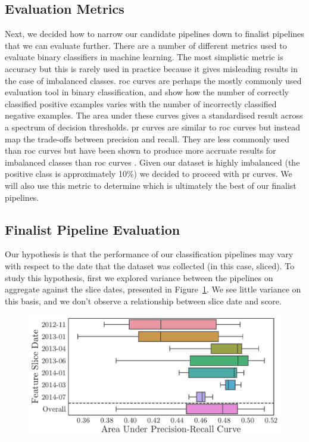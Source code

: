 \documentclass[../thesis/thesis.tex]{subfiles}
\begin{document}
\subsection{Evaluation Metrics}

Next, we decided how to narrow our candidate pipelines down to finalist pipelines that we can evaluate further. There are a number of different metrics used to evaluate binary classifiers in machine learning. The most simplistic metric is accuracy but this is rarely used in practice because it gives misleading results in the case of imbalanced classes. \Gls{roc} curves are perhaps the mostly commonly used evaluation tool in binary classification, and show how the number of correctly classified positive examples varies with the number of incorrectly classified negative examples. The area under these curves gives a standardised result across a spectrum of decision thresholds. \Gls{pr} curves are similar to \gls{roc} curves but instead map the trade-offs between precision and recall. They are less commonly used than \gls{roc} curves but have been shown to produce more accruate results for imbalanced classes than \gls{roc} curves \cite{davis2006}. Given our dataset is highly imbalanced (the positive class is approximately 10\%) we decided to proceed with \gls{pr} curves. We will also use this metric to determine which is ultimately the best of our finalist pipelines.

\subsection{Finalist Pipeline Evaluation}

Our hypothesis is that the performance of our classification pipelines may vary with respect to the date that the dataset was collected (in this case, sliced). To study this hypothesis, first we explored variance between the pipelines on aggregate against the slice dates, presented in Figure~\ref{fig:design:selection_agg_slice}. We see little variance on this basis, and we don't observe a relationship between slice date and score.

\begin{figure}[!htb]
    \centering
    \includegraphics[width=\textwidth]{../figures/design/selection_agg_slice}
    \caption[Pipeline performance by slice date]{}
    \label{fig:design:selection_agg_slice}
\end{figure}
\end{document}
